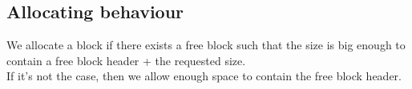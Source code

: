 \documentclass[twoside]{article}
\begin{document}
\subsection{Allocating behaviour}
We allocate a block if there exists a free block such that the size is big
enough to contain a free block header + the requested size.\\

If it's not the case, then we allow enough space to contain the free block
header.
\end{document}
